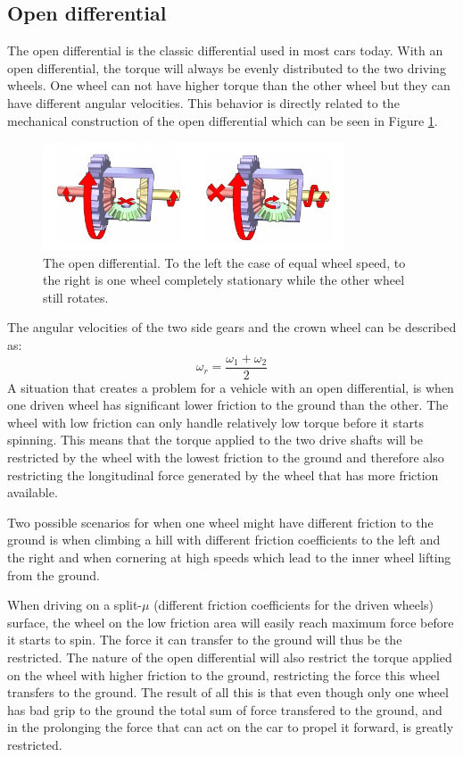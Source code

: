 \subsection{Open differential}
The open differential is the classic differential used in most cars today. With an open differential, the torque will always be evenly distributed to the two driving wheels. One wheel can not have higher torque than the other wheel but they can have different angular velocities. This behavior is directly related to the mechanical construction of the open differential which can be seen in Figure \ref{wikidiff}. 
\begin{figure}[h]
	\centering
	\includegraphics[width=0.8\textwidth]{Pictures/opendiff}
	\caption{The open differential. To the left the case of equal wheel speed, to the right is one wheel completely stationary while the other wheel still rotates. \cite{wikidiff}}
	\label{wikidiff}
\end{figure}
The angular velocities of the two side gears and the crown wheel can be described as:
\begin{equation}
\omega_{r} = \frac{\omega_{1} + \omega_{2}}{2}
\label{eq:diff}
\end{equation}
A situation that creates a problem for a vehicle with an open differential, is when one driven wheel has significant lower friction to the ground than the other. The wheel with low friction can only handle relatively low torque before it starts spinning. This means that the torque applied to the two drive shafts will be restricted by the wheel with the lowest friction to the ground and therefore also restricting the longitudinal force generated by the wheel that has more friction available.

Two possible scenarios for when one wheel might have different friction to the ground is when climbing a hill with different friction coefficients to the left and the right and when cornering at high speeds which lead to the inner wheel lifting from the ground. 

When driving on a split-$ \mu $ (different friction coefficients for the driven wheels) surface, the wheel on the low friction area will easily reach maximum force before it starts to spin. The force it can transfer to the ground will thus be the restricted. The nature of the open differential will also restrict the torque applied on the wheel with higher friction to the ground, restricting the force this wheel transfers to the ground. The result of all this is that even though only one wheel has bad grip to the ground the total sum of force transfered to the ground, and in the prolonging the force that can act on the car to propel it forward, is greatly restricted.

